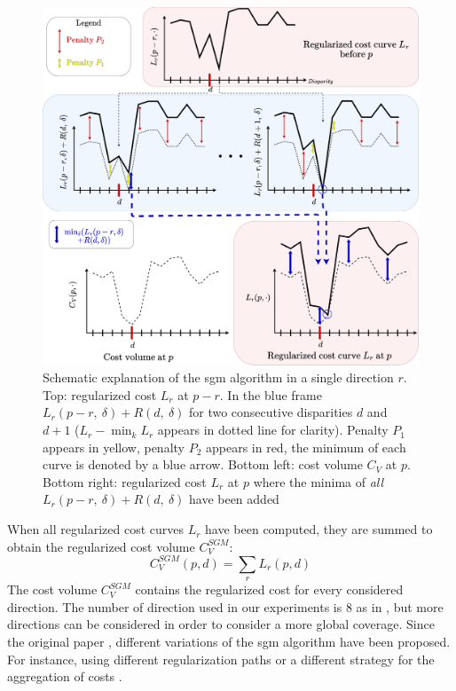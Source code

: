 \begin{figure}
	\centering
	\includegraphics[width=\linewidth]{Images/Chap_1/SGM.png}
	\caption{Schematic explanation of the \acrshort{sgm} algorithm in a single direction $r$. Top: regularized cost $L_r$ at $p-r$. In the blue frame $L_r(p-r,~\delta)+R(d,~\delta)$ for two consecutive disparities $d$ and $d+1$ ($L_r-\min_k L_r$ appears in dotted line for clarity). Penalty $P_1$ appears in yellow, penalty $P_2$ appears in red, the minimum of each curve is denoted by a blue arrow. Bottom left: cost volume $C_V$ at $p$. Bottom right: regularized cost $L_r$ at $p$ where the minima of \textit{all} $L_r(p-r,~\delta)+R(d,~\delta)$ have been added}
	\label{fig:sgm}
\end{figure}

When all regularized cost curves $L_r$ have been computed, they are summed to obtain the regularized cost volume $C_V^{SGM}$:
\begin{equation}
    C_V^{SGM}(p, d) = \sum_r L_r(p,d)
\end{equation}
The cost volume $C^{SGM}_V$ contains the regularized cost for every  considered direction. The number of direction used in our experiments is 8 as in , but more directions can be considered in order to consider a more global coverage. Since the original paper \cite{hirschmuller_accurate_2005}, different variations of the \acrshort{sgm} algorithm have been proposed. For instance, using different regularization paths \cite{facciolo_mgm_2015} or a different strategy for the aggregation of costs \cite{poggi_learning_2016}.

